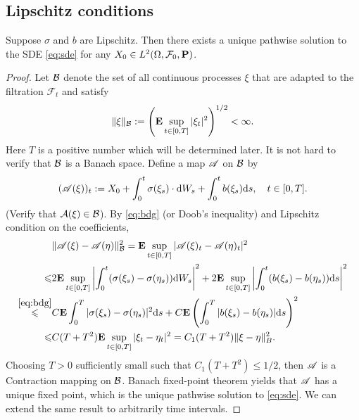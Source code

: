 \subsection{Lipschitz conditions}
\begin{theorem}[It\^o]\label{thm:Ito}
    Suppose $\sigma$ and $b$ are Lipschitz. Then there exists a unique pathwise solution to the SDE \eqref{eq:sde} for any $X_0\in L^2(\Omega, {\mathcal F}_0, {\mathbf P})$.
\end{theorem}
\begin{proof}
    Let ${\mathcal B}$ denote the set of all continuous processes $\xi$ that are adapted to the filtration $\mathcal{F}_t$ and satisfy
    $$
    \|\xi\|_{\mathcal B}:= \left({\mathbf E} \sup_{t\in [0,T]} |\xi_t|^2\right)^{1/2}<\infty. 
    $$
    Here $T$ is a positive number which will be determined later. It is not hard to verify that ${\mathcal B}$ is a Banach space. Define a map ${\mathscr A}$ on ${\mathcal B}$ by 
    \begin{align*}
	({\mathscr A}(\xi))_t:= X_0+ \int_0^t \sigma(\xi_s) \cdot \text{\rm{d}} W_s+\int_0^t b(\xi_s) \text{\rm{d}} s, \quad t\in [0,T]. 
    \end{align*}
    (Verify that \({\mathcal A}(\xi)\in {\mathcal B}\)). By \eqref{eq:bdg} (or Doob's inequality) and Lipschitz condition on the coefficients, 
    \begin{equation*}
	\begin{aligned}
            &\|{\mathscr A}(\xi)-{\mathscr A}(\eta)\|_{{\mathcal B}}^2= {\mathbf E} \sup_{t\in [0,T]}|{\mathscr A}(\xi)_{t}-{\mathscr A}(\eta)_{t}|^2\\
            \leqslant & 2 {\mathbf E} \sup_{t\in [0,T]} \left| \int_0^t (\sigma(\xi_s) -\sigma(\eta_s)) \text{\rm{d}} W_s\right|^2+ 2 {\mathbf E} \sup_{t\in [0,T]} \left|\int_0^t (b(\xi_s) -b(\eta_s)) \text{\rm{d}} s\right|^2\\
            \overset{\eqref{eq:bdg}}{\leqslant} & C {\mathbf E} \int_0^T |\sigma(\xi_s)-\sigma(\eta_s)|^2 \text{\rm{d}} s + C {\mathbf E} \left( \int_0^T |b(\xi_s)-b(\eta_s)| \text{\rm{d}} s \right)^2 \\
            \leqslant & C (T+T^2) {\mathbf E} \sup_{t\in [0,T]}|\xi_{t}-\eta_{t}|^2=C_1(T+T^2) \|\xi-\eta\|_B^2.
	\end{aligned}
    \end{equation*}
    Choosing $T>0$ sufficiently small such that $C_1 (T+T^2)\leq 1/2$, then ${\mathscr A}$ is a Contraction mapping on ${\mathcal B}$. Banach fixed-point theorem yields that ${\mathscr A}$ has a unique fixed point, which is the unique pathwise solution to \eqref{eq:sde}. We can extend the same result to arbitrarily time intervals. 
\end{proof}
	
